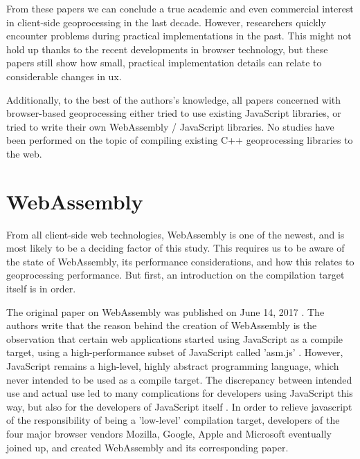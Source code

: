 
From these papers we can conclude a true academic and even commercial interest in client-side geoprocessing in the last decade. However, researchers quickly encounter problems during practical implementations in the past. This might not hold up thanks to the recent developments in browser technology, but these papers still show how small, practical implementation details can relate to considerable changes in \ac{ux}. 

Additionally, to the best of the authors's knowledge, all papers concerned with browser-based geoprocessing either tried to use existing JavaScript libraries, or tried to write their own WebAssembly / JavaScript libraries. No studies have been performed on the topic of compiling existing C++ geoprocessing libraries to the web. 

\newpage
\section{WebAssembly}

From all client-side web technologies, WebAssembly is one of the newest, and is most likely to be a deciding factor of this study. This requires us to be aware of the state of WebAssembly, its performance considerations, and how this relates to geoprocessing performance. But first, an introduction on the compilation target itself is in order.

The original paper on WebAssembly was published on June 14, 2017 \cite{haas_bringing_2017}. The authors write that the reason behind the creation of WebAssembly is the observation that certain web applications started using JavaScript as a compile target, using a high-performance subset of JavaScript called 'asm.js' \cite{mozilla_asmjs_2013}. However, JavaScript remains a high-level, highly abstract programming language, which never intended to be used as a compile target. The discrepancy between intended use and actual use led to many complications for developers using JavaScript this way, but also for the developers of JavaScript itself \cite{haas_bringing_2017}. 
In order to relieve javascript of the responsibility of being a 'low-level' compilation target, developers of the four major browser vendors Mozilla, Google, Apple and Microsoft eventually joined up, and created WebAssembly and its corresponding paper.

